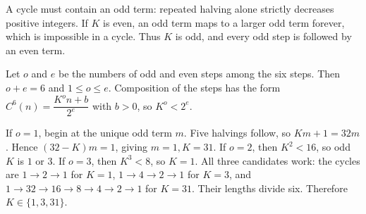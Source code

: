 A cycle must contain an odd term: repeated halving alone strictly decreases positive integers. If $K$ is even, an odd term maps to a larger odd term forever, which is impossible in a cycle. Thus $K$ is odd, and every odd step is followed by an even term.

Let $o$ and $e$ be the numbers of odd and even steps among the six steps. Then $o+e=6$ and $1\le o\le e$. Composition of the steps has the form $C^6(n)=\dfrac{K^o n+b}{2^e}$ with $b>0$, so $K^o<2^e$.

If $o=1$, begin at the unique odd term $m$. Five halvings follow, so $Km+1=32m$. Hence $(32-K)m=1$, giving $m=1,K=31$.
If $o=2$, then $K^2<16$, so odd $K$ is $1$ or $3$.
If $o=3$, then $K^3<8$, so $K=1$.
All three candidates work: the cycles are $1\to2\to1$ for $K=1$, $1\to4\to2\to1$ for $K=3$, and $1\to32\to16\to8\to4\to2\to1$ for $K=31$. Their lengths divide six. Therefore $\boxed{K\in\{1,3,31\}}$.
